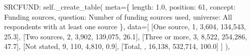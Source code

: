 \documentclass[
  11pt,
  a4paper,
]{article}
\newenvironment{Shaded}{\begin{snugshade}}{\end{snugshade}}
\newcommand{\NormalTok}[1]{\textcolor[rgb]{0.00,0.23,0.31}{#1}}
\newcommand{\OperatorTok}[1]{\textcolor[rgb]{0.37,0.37,0.37}{#1}}
\newcommand{\StringTok}[1]{\textcolor[rgb]{0.13,0.47,0.30}{#1}}
\newcommand{\VariableTok}[1]{\textcolor[rgb]{0.07,0.07,0.07}{#1}}
\begin{document}
\begin{Shaded}
\begin{Highlighting}[]
            \StringTok{\textquotesingle{}SRCFUND\textquotesingle{}}\NormalTok{: }\VariableTok{self}\NormalTok{.\_create\_table(}
\NormalTok{                meta}\OperatorTok{=}\NormalTok{\{}
                    \StringTok{\textquotesingle{}length\textquotesingle{}}\NormalTok{: }\StringTok{\textquotesingle{}1.0\textquotesingle{}}\NormalTok{, }\StringTok{\textquotesingle{}position\textquotesingle{}}\NormalTok{: }\StringTok{\textquotesingle{}61\textquotesingle{}}\NormalTok{,}
                    \StringTok{\textquotesingle{}concept\textquotesingle{}}\NormalTok{: }\StringTok{\textquotesingle{}Funding sources\textquotesingle{}}\NormalTok{,}
                    \StringTok{\textquotesingle{}question\textquotesingle{}}\NormalTok{: }\StringTok{\textquotesingle{}Number of funding sources used\textquotesingle{}}\NormalTok{,}
                    \StringTok{\textquotesingle{}universe\textquotesingle{}}\NormalTok{: }\StringTok{\textquotesingle{}All respondents with at least one source\textquotesingle{}}
\NormalTok{                \},}
\NormalTok{                data}\OperatorTok{=}\NormalTok{[}
\NormalTok{                    [}\StringTok{\textquotesingle{}One source\textquotesingle{}}\NormalTok{, }\StringTok{\textquotesingle{}1\textquotesingle{}}\NormalTok{, }\StringTok{\textquotesingle{}3,604\textquotesingle{}}\NormalTok{, }\StringTok{\textquotesingle{}134,543\textquotesingle{}}\NormalTok{, }\StringTok{\textquotesingle{}25.3\textquotesingle{}}\NormalTok{],}
\NormalTok{                    [}\StringTok{\textquotesingle{}Two sources\textquotesingle{}}\NormalTok{, }\StringTok{\textquotesingle{}2\textquotesingle{}}\NormalTok{, }\StringTok{\textquotesingle{}3,902\textquotesingle{}}\NormalTok{, }\StringTok{\textquotesingle{}139,075\textquotesingle{}}\NormalTok{, }\StringTok{\textquotesingle{}26.1\textquotesingle{}}\NormalTok{],}
\NormalTok{                    [}\StringTok{\textquotesingle{}Three or more\textquotesingle{}}\NormalTok{, }\StringTok{\textquotesingle{}3\textquotesingle{}}\NormalTok{, }\StringTok{\textquotesingle{}8,522\textquotesingle{}}\NormalTok{, }\StringTok{\textquotesingle{}254,286\textquotesingle{}}\NormalTok{, }\StringTok{\textquotesingle{}47.7\textquotesingle{}}\NormalTok{],}
\NormalTok{                    [}\StringTok{\textquotesingle{}Not stated\textquotesingle{}}\NormalTok{, }\StringTok{\textquotesingle{}9\textquotesingle{}}\NormalTok{, }\StringTok{\textquotesingle{}110\textquotesingle{}}\NormalTok{, }\StringTok{\textquotesingle{}4,810\textquotesingle{}}\NormalTok{, }\StringTok{\textquotesingle{}0.9\textquotesingle{}}\NormalTok{],}
\NormalTok{                    [}\StringTok{\textquotesingle{}Total\textquotesingle{}}\NormalTok{, }\StringTok{\textquotesingle{}\textquotesingle{}}\NormalTok{, }\StringTok{\textquotesingle{}16,138\textquotesingle{}}\NormalTok{, }\StringTok{\textquotesingle{}532,714\textquotesingle{}}\NormalTok{, }\StringTok{\textquotesingle{}100.0\textquotesingle{}}\NormalTok{]}
\NormalTok{                ]}
\NormalTok{            ),}
            

\end{Highlighting}
\end{Shaded}
\end{document}
